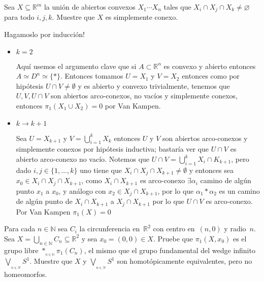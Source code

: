 \documentclass[11pt]{article}
\newcommand{\R}{{\mathbb{R}}}
\newcommand{\N}{{\mathbb{N}}}
\newenvironment{proof}[1][Demostraci\'on]{\begin{trivlist}
\item[\hskip \labelsep {\bfseries #1}]}{\end{trivlist}}
\begin{document}
\begin{enumerate}
\item {Sea $X\subseteq \R^m$ la uni\'on de abiertos convexos $X_1 \cdots X_n$ tales que $X_i\cap X_j \cap X_k\neq \varnothing$ para todo $i,j,k$. Muestre que $X$ es simplemente conexo.
}

\begin{proof}

Hagamoslo por inducci\'on!

\begin{itemize}

\item {$k=2$}

Aqu\'i usemos el argumento clave que si $A \subset \R^n$ es convexo y abierto entonces $A \simeq D^n \simeq \{*\}$. Entonces tomamos $U = X_1$ y $V = X_2$ entonces como por hip\'otesis $U \cap V \neq \emptyset$ y es abierto y convexo trivialmente, tenemos que $U,V,U \cap V$ son abiertos arco-conexos, no vac\'ios y simplemente conexos, entonces $\pi_1(X_1 \cup X_2) = 0$ por Van Kampen.

\item {$k \rightarrow k+1$}

Sea $U = X_{k+1}$ y $V = \bigcup _{i=1}^{k} {X_k}$ entonces $U$ y $V$ son abiertos arco-conexos y simplemente conexos por hip\'otesis inductiva; bastar\'ia  ver que $U \cap V$ es abierto arco-conexo no vac\'io. Notemos que $U \cap V = \bigcup_{i=1}^{k} {X_i \cap K_{k+1}}$, pero dado $i,j \in \{1, \dots , k\}$ uno tiene que $X_i \cap X_j \cap X_{k+1} \neq \emptyset$ y entonces sea $x_0 \in X_i \cap X_j \cap X_{k+1}$, como $X_i \cap X_{k+1}$ es arco-conexo $\exists \alpha_i$ camino de alg\'un punto $x_1$ a $x_0$, y an\'alogo con $x_2 \in X_j \cap X_{k+1}$, por lo que $\alpha_1 * \alpha_2$ es un camino de alg\'un punto de $X_i \cap X_{k+1}$ a $X_j \cap X_{k+1}$ por lo que $U \cap V$ es arco-conexo. Por Van Kampen $\pi_1(X) = 0$

\end{itemize}

\end{proof}

\item {Para cada $n\in \N$ sea $C_i$ la circunferencia en~$ \R^2$
con centro en~$(n,0)$ y radio~$n$. Sea $X=\bigcup_{n\in \N} C_n\subseteq  \R^ 2$ y sea
$x_0=(0,0)\in X$. Pruebe que  $\pi_1(X,x_0)$ es el grupo libre $\ast_{_{n\in \N}} \pi_1(C_n)$, el mismo que el grupo fundamental del
wedge infinito $\bigvee_{_{n\in N}} S^1$. Muestre que $X$ y $\bigvee_{_{n\in N}} S^1$ son homot\'opicamente equivalentes, pero no
homeomorfos.
}


\end{enumerate}
\end{document}
